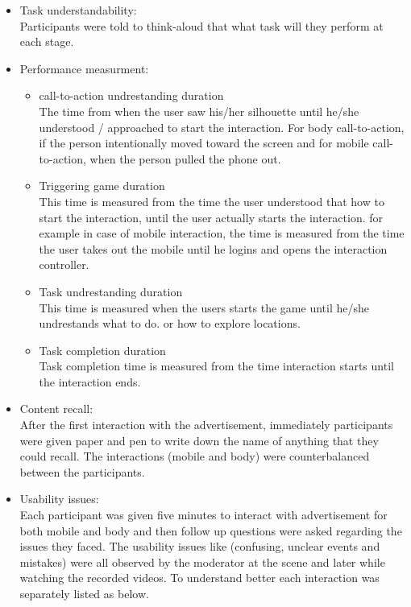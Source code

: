 \begin{itemize}

\item Task understandability: \\
Participants were told to think-aloud that what task will they perform at each stage. 


\item Performance measurment: \\

\begin{itemize}
\item call-to-action undrestanding duration \\
The time from when the user saw his/her silhouette until he/she understood / approached to start the interaction. For body call-to-action, if the person intentionally moved toward the screen and for mobile call-to-action, when the person pulled the phone out.

\item Triggering game duration\\
This time is measured from the time the user understood that how to start the interaction, until the user actually starts the interaction. for example in case of mobile interaction, the time is measured from the time the user takes out the mobile until he logins and opens the interaction controller.

\item Task undrestanding duration \\
This time is measured when the users starts the game until he/she undrestands what to do. or how to explore locations.

\item Task completion duration \\
Task completion time is measured from the time interaction starts until the interaction ends. 

\end{itemize}


\item Content recall: \\
After the first interaction with the advertisement, immediately participants were given paper and pen to write down the name of anything that they could recall. The interactions (mobile and body) were counterbalanced between the participants.


\item Usability issues: \\
Each participant was given five minutes to interact with advertisement for both mobile and body and then follow up questions were asked regarding the issues they faced.
The usability issues like (confusing, unclear events and mistakes) were all observed by the moderator at the scene and later while watching the recorded videos. To understand better each interaction was separately listed as below.

\end{itemize}

